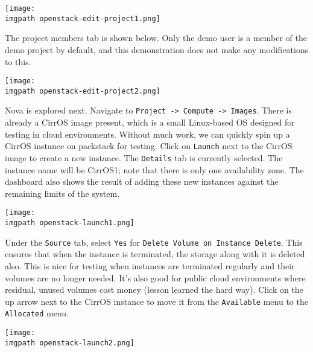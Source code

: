     \begin{minipage}[t]{\linewidth}
	  \centering
      \texttt{[image: \\imgpath openstack-edit-project1.png]}
    \end{minipage}

The project members tab is shown below. Only the demo user is a member of the
demo project by default, and this demonstration does not make any
modifications to this.

    \begin{minipage}[t]{\linewidth}
	  \centering
      \texttt{[image: \\imgpath openstack-edit-project2.png]}
    \end{minipage}

Nova is explored next. Navigate to \verb|Project -> Compute -> Images|. There is
already a CirrOS image present, which is a small Linux-based OS designed for
testing in cloud environments. Without much work, we can quickly spin up a
CirrOS instance on packstack for testing. Click on \verb|Launch| next to the
CirrOS image to create a new instance. The \verb|Details| tab is currently
selected. The instance name will be CirrOS1; note that there is only one
availability zone.  The dashboard also shows the result of adding these new
instances against the remaining limits of the system.

    \begin{minipage}[t]{\linewidth}
	  \centering
      \texttt{[image: \\imgpath openstack-launch1.png]}
    \end{minipage}

Under the \verb|Source| tab, select \verb|Yes| for
\verb|Delete Volume on Instance Delete|. This ensures that when the instance
is terminated, the storage along with it is deleted also. This is nice for
testing when instances are terminated regularly and their volumes are no
longer needed. It’s also good for public cloud environments where residual,
unused volumes cost money (lesson learned the hard way). Click on the up arrow
next to the CirrOS instance to move it from the \verb|Available| menu to the
\verb|Allocated| menu.

    \begin{minipage}[t]{\linewidth}
	  \centering
      \texttt{[image: \\imgpath openstack-launch2.png]}
    \end{minipage}

